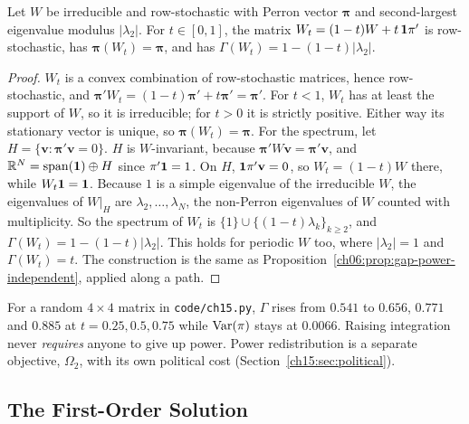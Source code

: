 \documentclass[../structural_economics_book.tex]{subfiles}
\begin{document}
\begin{proposition}\label{ch15:prop:pi_path}
Let $W$ be irreducible and row-stochastic with Perron vector $\boldsymbol{\pi}$ and second-largest eigenvalue modulus $|\lambda_2|$. For $t \in [0, 1]$, the matrix $W_t = (1-t)W + t\,\mathbf{1}\pi'$ is row-stochastic, has $\boldsymbol{\pi}(W_t) = \boldsymbol{\pi}$, and has $\Gamma(W_t) = 1 - (1-t)|\lambda_2|$.
\end{proposition}

\begin{proof}
$W_t$ is a convex combination of row-stochastic matrices, hence row-stochastic, and $\boldsymbol{\pi}'W_t = (1-t)\boldsymbol{\pi}' + t\boldsymbol{\pi}' = \boldsymbol{\pi}'$. For $t < 1$, $W_t$ has at least the support of $W$, so it is irreducible; for $t > 0$ it is strictly positive. Either way its stationary vector is unique, so $\boldsymbol{\pi}(W_t) = \boldsymbol{\pi}$. For the spectrum, let $H = \{\mathbf{v} : \boldsymbol{\pi}'\mathbf{v} = 0\}$. $H$ is $W$-invariant, because $\boldsymbol{\pi}'W\mathbf{v} = \boldsymbol{\pi}'\mathbf{v}$, and $\mathbb{R}^N = \mathrm{span}(\mathbf{1}) \oplus H$ since $\pi'\mathbf{1} = 1$. On $H$, $\mathbf{1}\pi'\mathbf{v} = 0$, so $W_t = (1-t)W$ there, while $W_t\mathbf{1} = \mathbf{1}$. Because $1$ is a simple eigenvalue of the irreducible $W$, the eigenvalues of $W|_H$ are $\lambda_2, \ldots, \lambda_N$, the non-Perron eigenvalues of $W$ counted with multiplicity. So the spectrum of $W_t$ is $\{1\} \cup \{(1-t)\lambda_k\}_{k\geq 2}$, and $\Gamma(W_t) = 1 - (1-t)|\lambda_2|$. This holds for periodic $W$ too, where $|\lambda_2| = 1$ and $\Gamma(W_t) = t$. The construction is the same as Proposition~\ref{ch06:prop:gap-power-independent}, applied along a path.
\end{proof}

For a random $4 \times 4$ matrix in \texttt{code/ch15.py}, $\Gamma$ rises from $0.541$ to $0.656$, $0.771$ and $0.885$ at $t = 0.25, 0.5, 0.75$ while $\operatorname{Var}(\pi)$ stays at $0.0066$. Raising integration never \emph{requires} anyone to give up power. Power redistribution is a separate objective, $\Omega_2$, with its own political cost (Section~\ref{ch15:sec:political}).


\subsection{The First-Order Solution}
\end{document}
